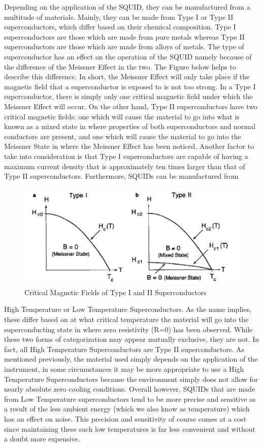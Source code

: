 \documentclass[conf]{new-aiaa}
\begin{document}
Depending on the application of the SQUID, they can be manufactured from a multitude of materials. Mainly, they can be made from Type I or Type II superconductors, which differ based on their chemical composition. Type I superconductors are those which are made from pure metals whereas Type II superconductors are those which are made from alloys of metals. The type of superconductor has an effect on the operation of the SQUID namely because of the difference of the Meissner Effect in the two. The Figure below helps to describe this difference. In short, the Meissner Effect will only take place if the magnetic field that a superconductor is exposed to is not too strong. In a Type I superconductor, there is simply only one critical magnetic field under which the Meissner Effect will occur. On the other hand, Type II superconductors have two critical magnetic fields: one which will cause the material to go into what is known as a mixed state in where properties of both superconductors and normal conductors are present, and one which will cause the material to go into the Meissner State in where the Meissner Effect has been noticed. Another factor to take into consideration is that Type I superconductors are capable of having a maximum current density that is approximately ten times larger than that of Type II superconductors. Furthermore, SQUIDs can be manufactured from

\begin{figure}[!h]
    \centering
    \includegraphics[scale = 0.7]{Meissner.png}
    \caption{Critical Magnetic Fields of Type I and II Superconductors}
\end{figure}

\noindent
High Temperature or Low Temperature Superconductors. As the name implies, these differ based on at what critical temperature the material will go into the superconducting state in where zero resistivity (R=0) has been observed. While these two forms of categorization may appear mutually exclusive, they are not. In fact, all High Temperature Superconductors are Type II superconductors. As mentioned previously, the material used simply depends on the application of the instrument, in some circumstances it may be more appropriate to use a High Temperature Superconductors because the environment simply does not allow for nearly absolute zero cooling conditions. Overall however, SQUIDs that are made from Low Temperature superconductors tend to be more precise and sensitive as a result of the less ambient energy (which we also know as temperature) which has an effect on noise. This precision and sensitivity of course comes at a cost since maintaining these such low temperatures is far less convenient and without a doubt more expensive.
\end{document}
